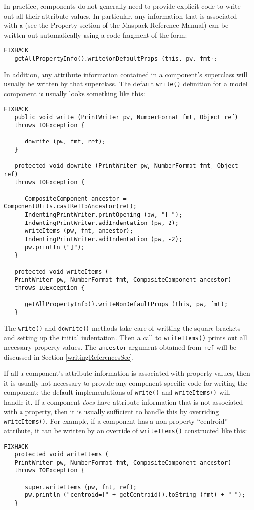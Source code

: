 \documentclass{article}
\begin{document}
In practice, components do not generally need to provide explicit code
to write out all their attribute values. In particular, any
information that is associated with a
 (see the Property section of
the Maspack Reference Manual) can be written out automatically using a
code fragment of the form:
\begin{lstlisting}FIXHACK
   getAllPropertyInfo().writeNonDefaultProps (this, pw, fmt);
\end{lstlisting}
In addition, any attribute information contained in a component's
superclass will usually be written by that superclass.
The default {\tt write()} definition for a model component
is usually looks something like this:
\begin{lstlisting}FIXHACK
   public void write (PrintWriter pw, NumberFormat fmt, Object ref)
   throws IOException {

      dowrite (pw, fmt, ref);
   }

   protected void dowrite (PrintWriter pw, NumberFormat fmt, Object ref)
   throws IOException {

      CompositeComponent ancestor = ComponentUtils.castRefToAncestor(ref);
      IndentingPrintWriter.printOpening (pw, "[ ");
      IndentingPrintWriter.addIndentation (pw, 2);
      writeItems (pw, fmt, ancestor);
      IndentingPrintWriter.addIndentation (pw, -2);
      pw.println ("]");
   }

   protected void writeItems (
   PrintWriter pw, NumberFormat fmt, CompositeComponent ancestor) 
   throws IOException {

      getAllPropertyInfo().writeNonDefaultProps (this, pw, fmt);
   }
\end{lstlisting}
The {\tt write()} and {\tt dowrite()} methods take care of writting
the square brackets and setting up the initial indentation. Then a
call to {\tt writeItems()} prints out all necessary property
values. The {\tt ancestor} argument obtained from {\tt ref} will be
discussed in Section \ref{writingReferencesSec}.

If all a component's attribute information is associated with
property values, then it is usually not necessary to provide
any component-specific code for writing the component: the
default implementations of {\tt write()} and {\tt writeItems()}
will handle it. If a component {\it does} have attribute information
that is not associated with a property, then it is
usually sufficient to handle this by overriding {\tt writeItems()}.
For example,
if a component has a non-property ``centroid'' attribute,
it can be written by an override of {\tt writeItems()} 
constructed like this:
\begin{lstlisting}FIXHACK
   protected void writeItems (
   PrintWriter pw, NumberFormat fmt, CompositeComponent ancestor) 
   throws IOException {

      super.writeItems (pw, fmt, ref);
      pw.println ("centroid=[" + getCentroid().toString (fmt) + "]");      
   }   
\end{lstlisting}
\end{document}
